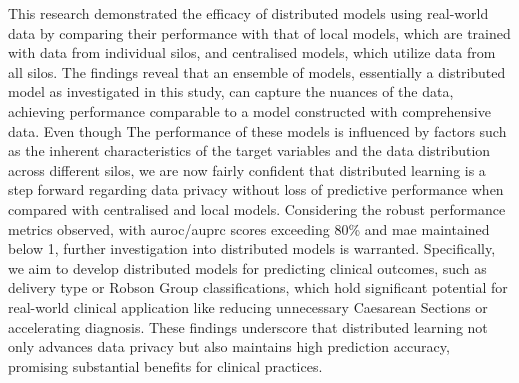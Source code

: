 
This research demonstrated the efficacy of distributed models using real-world data by comparing their performance with that of local models, which are trained with data from individual silos, and centralised models, which utilize data from all silos. The findings reveal that an ensemble of models, essentially a distributed model as investigated in this study, can capture the nuances of the data, achieving performance comparable to a model constructed with comprehensive data. Even though The performance of these models is influenced by factors such as the inherent characteristics of the target variables and the data distribution across different silos, we are now fairly confident that distributed learning is a step forward regarding data privacy without loss of predictive performance when compared with centralised and local models.
Considering the robust performance metrics observed, with \ac{auroc}/\ac{auprc} scores exceeding 80\% and \ac{mae} maintained below 1, further investigation into distributed models is warranted. Specifically, we aim to develop distributed models for predicting clinical outcomes, such as delivery type or Robson Group classifications, which hold significant potential for real-world clinical application like reducing unnecessary Caesarean Sections or accelerating diagnosis. These findings underscore that distributed learning not only advances data privacy but also maintains high prediction accuracy, promising substantial benefits for clinical practices.

